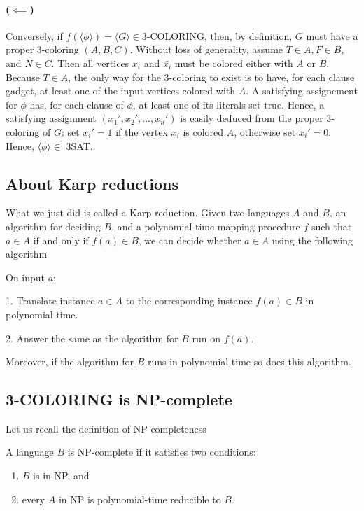 \paragraph{($\impliedby$)} Conversely, if $f(\langle \phi \rangle) = \langle G
\rangle \in \text{3-COLORING}$,
then, by definition, $G$ must have a proper 3-coloring $(A,B,C)$. Without loss
of generality, assume $T\in A, F\in B$, and $N\in C$. Then all vertices $x_i$
and $\bar{x_i}$ must be colored either with $A$ or $B$. Because $T\in A$,
the only way for the 3-coloring to exist is to have, for each clause gadget,
at least one of the input vertices colored with $A$. A satisfying assignement
for $\phi$ has, for each clause of $\phi$, at least one of its literals set
true. Hence, a satisfying assignment $(x_1', x_2', \ldots, x_n')$ is easily
deduced from the proper 3-coloring of $G$: set $x_i'=1$ if the vertex $x_i$ is
colored $A$, otherwise set $x_i'=0$. Hence, $\langle \phi \rangle \in$ 3SAT.

\subsection{About Karp reductions}

What we just did is called a Karp reduction. Given two languages $A$
and $B$, an algorithm for deciding $B$, and a polynomial-time
mapping procedure $f$ such that
$a \in A$ if and only if $f(a) \in B$, we can decide whether $a \in A$ using
the following algorithm
\begin{TMachine}{On input $a$:}
\item[1.] Translate instance $a \in A$ to the corresponding instance $f(a) \in
	B$ in polynomial time.
\item[2.] Answer the same as the algorithm for $B$ run on $f(a)$.
\end{TMachine}
Moreover, if the algorithm for $B$ runs in polynomial time so does this
algorithm.

\subsection{3-COLORING is NP-complete}

Let us recall the definition of NP-completeness
\begin{definition}
	A language $B$ is NP-complete if it satisfies two conditions:
	\begin{enumerate}
		\item $B$ is in NP, and
		\item every $A$ in NP is polynomial-time reducible to $B$.
	\end{enumerate}
\end{definition}

